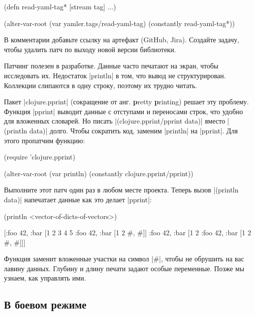 \begin{english}
  \begin{clojure}
(defn read-yaml-tag* [stream tag]
  ...)

(alter-var-root
 (var yamler.tags/read-yaml-tag)
 (constantly read-yaml-tag*))
  \end{clojure}
\end{english}

В комментарии добавьте ссылку на артефакт (GitHub, Jira). Создайте задачу,
чтобы удалить патч по выходу новой версии библиотеки.

Патчинг полезен в разработке. Данные часто печатают на экран, чтобы исследовать
их. Недостаток \spverb|println| в том, что вывод не структурирован. Коллекции
слипаются в одну строку, поэтому их трудно читать.

Пакет \spverb|clojure.pprint| (сокращение от анг. \textbf{p}retty \textbf{p}rinting)
решает эту проблему. Функция \spverb|pprint| выводит данные с отступами и переносами строк,
что удобно для вложенных словарей. Но писать \spverb|(clojure.pprint/pprint data)|
вместо \spverb|(println data)| долго. Чтобы сократить код, заменим \spverb|println|
на \spverb|pprint|. Для этого пропатчим функцию:

\begin{english}
  \begin{clojure}
(require 'clojure.pprint)

(alter-var-root
 (var println)
 (constantly clojure.pprint/pprint))
  \end{clojure}
\end{english}

Выполните этот патч один раз в любом месте проекта. Теперь вызов
\spverb|(println data)| напечатает данные как это делает \spverb|pprint|:

\begin{english}
  \begin{clojure}
(println <vector-of-dicts-of-vectors>)

[{:foo 42, :bar [1 2 3 4 5 {:foo 42, :bar [1 2 {#, #}]}]}
 {:foo 42, :bar [1 2 {:foo 42, :bar [1 2 {#, #}]}]}]
  \end{clojure}
\end{english}

Функция заменит вложенные участки на символ \spverb|#|, чтобы не обрушить на
вас лавину данных. Глубину и длину печати задают особые переменные. Позже мы
узнаем, как управлять ими.

\subsection{В боевом режиме}

